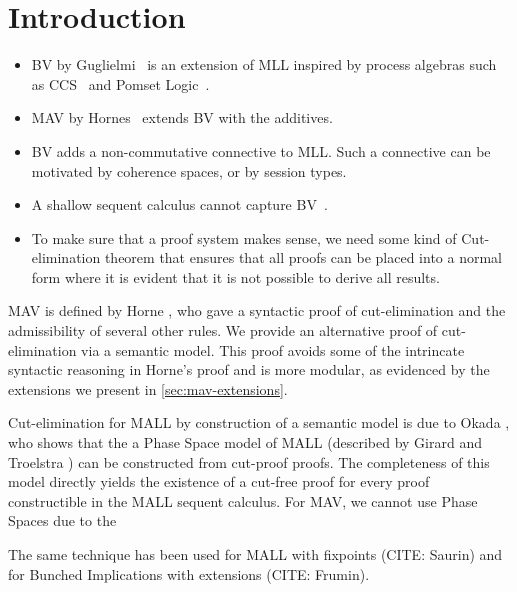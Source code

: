 \section{Introduction}\label{sec:introduction}

\begin{itemize}
      \item BV by Guglielmi~\cite{Guglielmi07:sis} is an extension of MLL inspired by process algebras such as CCS~\cite{Milner89:CC,Milner80:CCS} and Pomset Logic~\cite{Retore97:pomset}.
      \item MAV by Hornes~\cite{Horne15:mav} extends BV with the additives.
      \item BV adds a non-commutative connective to MLL. Such a connective can be motivated by coherence spaces, or by session types.
      \item A shallow sequent calculus cannot capture BV~\cite{Tiu06:sisii}.
      \item To make sure that a proof system makes sense, we need some kind
            of Cut-elimination theorem that ensures that all proofs can be
            placed into a normal form where it is evident that it is not
            possible to derive all results.
\end{itemize}

MAV is defined by Horne \cite{Horne15:mav}, who gave a syntactic proof
of cut-elimination and the admissibility of several other rules. We
provide an alternative proof of cut-elimination via a semantic
model. This proof avoids some of the intrincate syntactic reasoning in
Horne's proof and is more modular, as evidenced by the extensions we
present in \autoref{sec:mav-extensions}.

Cut-elimination for MALL by construction of a semantic model is due to
Okada \cite{Okada99:psc}, who shows that the a Phase Space model of
MALL (described by Girard \cite{Girard87:ll} and Troelstra
\cite{TroelstraXX:lnll}) can be constructed from cut-proof proofs. The
completeness of this model directly yields the existence of a cut-free
proof for every proof constructible in the MALL sequent calculus. For
MAV, we cannot use Phase Spaces due to the

The same technique has been used for MALL with fixpoints (CITE:
Saurin) and for Bunched Implications with extensions (CITE: Frumin).
